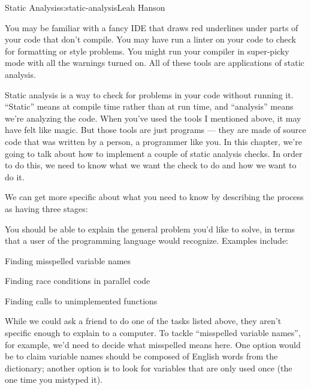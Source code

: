 \begin{aosachapter}{Static Analysis}{s:static-analysis}{Leah Hanson}

\label{introduction}

You may be familiar with a fancy IDE that draws red underlines under
parts of your code that don't compile. You may have run a linter on your
code to check for formatting or style problems. You might run your
compiler in super-picky mode with all the warnings turned on. All of
these tools are applications of static analysis.

Static analysis is a way to check for problems in your code without
running it. ``Static'' means at compile time rather than at run time,
and ``analysis'' means we're analyzing the code. When you've used the
tools I mentioned above, it may have felt like magic. But those tools
are just programs --- they are made of source code that was written by a
person, a programmer like you. In this chapter, we're going to talk
about how to implement a couple of static analysis checks. In order to
do this, we need to know what we want the check to do and how we want to
do it.

We can get more specific about what you need to know by describing the
process as having three stages:

\label{deciding-what-you-want-to-check-for.}

You should be able to explain the general problem you'd like to solve,
in terms that a user of the programming language would recognize.
Examples include:

\begin{aosaitemize}

\item
  Finding misspelled variable names
\item
  Finding race conditions in parallel code
\item
  Finding calls to unimplemented functions
\end{aosaitemize}

\label{deciding-how-exactly-to-check-for-it.}

While we could ask a friend to do one of the tasks listed above, they
aren't specific enough to explain to a computer. To tackle ``misspelled
variable names'', for example, we'd need to decide what misspelled means
here. One option would be to claim variable names should be composed of
English words from the dictionary; another option is to look for
variables that are only used once (the one time you mistyped it).


\end{aosachapter}
